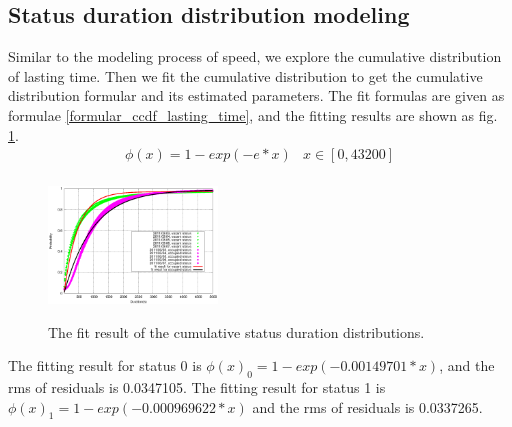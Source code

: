\subsection{Status duration distribution modeling}
\label{section_lasting_time_modeling}
Similar to the modeling process of speed, we explore the cumulative distribution of lasting time. Then we fit the cumulative distribution to get the cumulative distribution formular and its estimated parameters.
The fit formulas are given as formulae \ref{formular_ccdf_lasting_time}, and the fitting results are shown as  fig. \ref{figure_fit_ccdf_lasting_time}.
\begin{equation}\label{formular_ccdf_lasting_time}
\begin{array}{ll}
 \phi(x)=1-exp(-e*x)& x\in [0,43200]\\
\end{array}
\end{equation}

\begin{figure}[htbp]
\centering
\includegraphics[width=0.4\textwidth]{figures/fit/duration_fit.eps}\\
\caption{The fit result of the cumulative status duration distributions.}\label{figure_fit_ccdf_lasting_time}
\end{figure}


The fitting result for status 0 is $\phi(x)_0=1-exp(-0.00149701*x)$, and the rms of residuals is 0.0347105. The fitting result for status 1 is $\phi(x)_1=1-exp(-0.000969622 *x)$  and the rms of residuals is 0.0337265.
